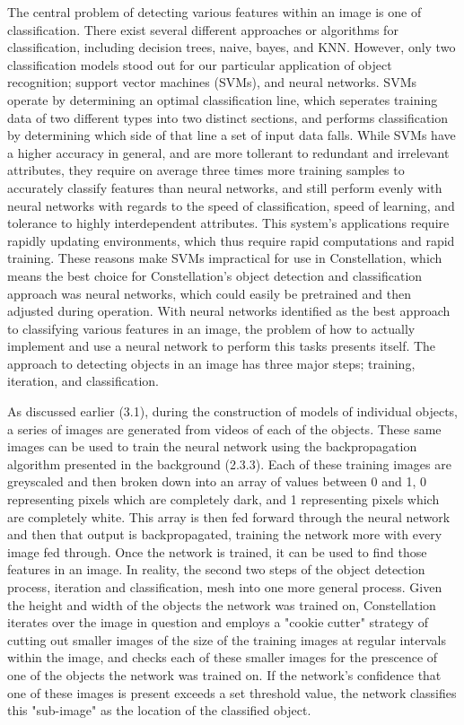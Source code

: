 The central problem of detecting various features within an image is one of classification. There exist several different approaches or algorithms for classification, including decision trees, naive, bayes, and KNN. However, only two classification models stood out for our particular application of object recognition; support vector machines (SVMs), and neural networks. SVMs operate by determining an optimal classification line, which seperates training data of two different types into two distinct sections, and performs classification by determining which side of that line a set of input data falls. While SVMs have a higher accuracy in general, and are more tollerant to redundant and irrelevant attributes, they require on average three times more training samples to accurately classify features than neural networks, and still perform evenly with neural networks with regards to the speed of classification, speed of learning, and tolerance to highly interdependent attributes. This system's applications require rapidly updating environments, which thus require rapid computations and rapid training. These reasons make SVMs impractical for use in Constellation, which means the best choice for Constellation's object detection and classification approach was neural networks, which could easily be pretrained and then adjusted during operation. With neural networks identified as the best approach to classifying various features in an image, the problem of how to actually implement and use a neural network to perform this tasks presents itself. The approach to detecting objects in an image has three major steps; training, iteration, and classification.

As discussed earlier (3.1), during the construction of models of individual objects, a series of images are generated from videos of each of the objects. These same images can be used to train the neural network using the backpropagation algorithm presented in the background (2.3.3). Each of these training images are greyscaled and then broken down into an array of values between 0 and 1, 0 representing pixels which are completely dark, and 1 representing pixels which are completely white. This array is then fed forward through the neural network and then that output is backpropagated, training the network more with every image fed through. Once the network is trained, it can be used to find those features in an image. In reality, the second two steps of the object detection process, iteration and classification, mesh into one more general process. Given the height and width of the objects the network was trained on, Constellation iterates over the image in question and employs a "cookie cutter" strategy of cutting out smaller images of the size of the training images at regular intervals within the image, and checks each of these smaller images for the prescence of one of the objects the network was trained on. If the network's confidence that one of these images is present exceeds a set threshold value, the network classifies this "sub-image" as the location of the classified object.

